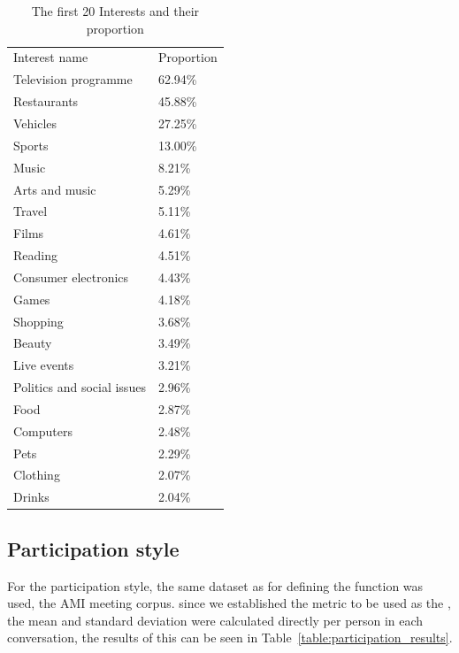 \begin{table}[]
    \begin{tabular}{ll}
    Interest name              & Proportion \\
    Television programme       & 62.94\%    \\
    Restaurants                & 45.88\%    \\
    Vehicles                   & 27.25\%    \\
    Sports                     & 13.00\%    \\
    Music                      & 8.21\%     \\
    Arts and music             & 5.29\%     \\
    Travel                     & 5.11\%     \\
    Films                      & 4.61\%     \\
    Reading                    & 4.51\%     \\
    Consumer electronics       & 4.43\%     \\
    Games                      & 4.18\%     \\
    Shopping                   & 3.68\%     \\
    Beauty                     & 3.49\%     \\
    Live events                & 3.21\%     \\
    Politics and social issues & 2.96\%     \\
    Food                       & 2.87\%     \\
    Computers                  & 2.48\%     \\
    Pets                       & 2.29\%     \\
    Clothing                   & 2.07\%     \\
    Drinks                     & 2.04\%    
    \end{tabular}
    \caption{The first 20 Interests and their proportion}
    \label{table:results_interests}
\end{table}

\subsection{Participation style}

For the participation style, the same dataset as for defining the function was used, the AMI meeting corpus. since we established the metric to be used as the , the mean and standard deviation were calculated directly per person in each conversation, the results of this can be seen in Table~\ref{table:participation_results}.\\

